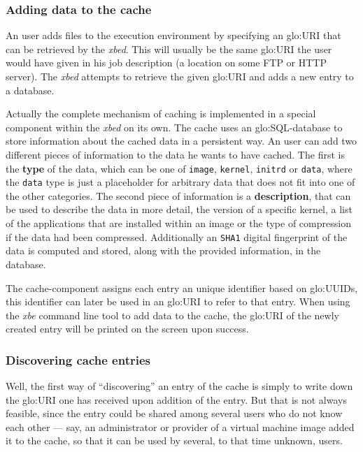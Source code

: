 \subsubsection{Adding data to the cache}

An  user  adds  files  to  the  execution  environment  by  specifying  an
\gls{glo:URI} that can be retrieved by the \emph{xbed}.  This will usually
be the same \gls{glo:URI} the user would have given in his job description
(\eg a location  on some FTP or HTTP server).  The \emph{xbed} attempts to
retrieve the given \gls{glo:URI} and adds a new entry to a database.

Actually the  complete mechanism  of caching is  implemented in  a special
component  within  the  \emph{xbed}  on   its  own.   The  cache  uses  an
\gls{glo:SQL}-database  to store information  about the  cached data  in a
persistent way. An user can add two different pieces of information to the
data he wants to have cached.  The first is the \textbf{type} of the data,
which can  be one  of \texttt{image}, \texttt{kernel},  \texttt{initrd} or
\texttt{data},  where the  \texttt{data} type  is just  a  placeholder for
arbitrary data  that does not fit  into one of the  other categories.  The
second piece of information is a \textbf{description}, that can be used to
describe the data in more detail,  \eg the version of a specific kernel, a
list of the applications that are installed within an image or the type of
compression   if  the   data   had  been   compressed.   Additionally   an
\texttt{SHA1}  digital fingerprint  of the  data is  computed  and stored,
along with the provided information, in the database.

The  cache-component assigns  each  entry an  unique  identifier based  on
\gls{glo:UUID}s, this identifier can later  be used in an \gls{glo:URI} to
refer to that  entry.  When using the \emph{xbe} command  line tool to add
data to  the cache, the \gls{glo:URI}  of the newly created  entry will be
printed on the screen upon success.

\subsubsection{Discovering cache entries}

Well, the first way of ``discovering''  an entry of the cache is simply to
write  down  the \gls{glo:URI}  one  has  received  upon addition  of  the
entry. But  that is not always  feasible, since the entry  could be shared
among several users  who do not know each other  --- say, an administrator
or provider of a  virtual machine image added it to the  cache, so that it
can be used by several, to that time unknown, users.

